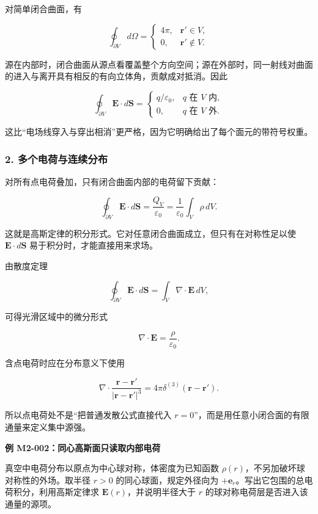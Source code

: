 对简单闭合曲面，有

\[
\oint_{\partial V}d\Omega
=
\begin{cases}
4\pi, & \mathbf r'\in V,\\
0, & \mathbf r'\notin V.
\end{cases}
\]

源在内部时，闭合曲面从源点看覆盖整个方向空间；源在外部时，同一射线对曲面的进入与离开具有相反的有向立体角，贡献成对抵消。因此

\[
\oint_{\partial V}\mathbf E\cdot d\mathbf S
=
\begin{cases}
q/\varepsilon_0, & q\text{ 在 }V\text{ 内},\\
0, & q\text{ 在 }V\text{ 外}.
\end{cases}
\]

这比``电场线穿入与穿出相消''更严格，因为它明确给出了每个面元的带符号权重。

\subsubsection{2.
多个电荷与连续分布}\label{m2:ux591aux4e2aux7535ux8377ux4e0eux8fdeux7eedux5206ux5e03}

对所有点电荷叠加，只有闭合曲面内部的电荷留下贡献：

\[
\boxed{
\oint_{\partial V}\mathbf E\cdot d\mathbf S
=
\frac{Q_V}{\varepsilon_0}
=
\frac{1}{\varepsilon_0}\int_V\rho\,dV
}.
\]

这就是高斯定律的积分形式。它对任意闭合曲面成立，但只有在对称性足以使
\(\mathbf E\cdot d\mathbf S\) 易于积分时，才能直接用来求场。

由散度定理

\[
\oint_{\partial V}\mathbf E\cdot d\mathbf S
=
\int_V\nabla\cdot\mathbf E\,dV,
\]

可得光滑区域中的微分形式

\[
\boxed{\nabla\cdot\mathbf E=\frac{\rho}{\varepsilon_0}}.
\]

含点电荷时应在分布意义下使用

\[
\nabla\cdot\frac{\mathbf r-\mathbf r'}{|\mathbf r-\mathbf r'|^3}
=
4\pi\delta^{(3)}(\mathbf r-\mathbf r').
\]

所以点电荷处不是``把普通发散公式直接代入
\(r=0\)''，而是用任意小闭合面的有限通量来定义集中源强。

\textbf{例 M2-002：同心高斯面只读取内部电荷}

真空中电荷分布以原点为中心球对称，体密度为已知函数
\(\rho(r)\)，不另加破坏球对称性的外场。取半径 \(r>0\)
的同心球面，规定外径向为
\(+\mathbf e_r\)。写出它包围的总电荷积分，利用高斯定律求
\(\mathbf E(r)\)，并说明半径大于 \(r\)
的球对称电荷层是否进入该通量的源项。

